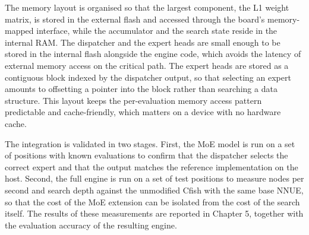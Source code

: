 The memory layout is organised so that the largest component, the L1 weight matrix, is stored in the external flash and accessed through the board's memory-mapped interface, while the accumulator and the search state reside in the internal RAM. The dispatcher and the expert heads are small enough to be stored in the internal flash alongside the engine code, which avoids the latency of external memory access on the critical path. The expert heads are stored as a contiguous block indexed by the dispatcher output, so that selecting an expert amounts to offsetting a pointer into the block rather than searching a data structure. This layout keeps the per-evaluation memory access pattern predictable and cache-friendly, which matters on a device with no hardware cache.

The integration is validated in two stages. First, the MoE model is run on a set of positions with known evaluations to confirm that the dispatcher selects the correct expert and that the output matches the reference implementation on the host. Second, the full engine is run on a set of test positions to measure nodes per second and search depth against the unmodified Cfish with the same base NNUE, so that the cost of the MoE extension can be isolated from the cost of the search itself. The results of these measurements are reported in Chapter 5, together with the evaluation accuracy of the resulting engine.
